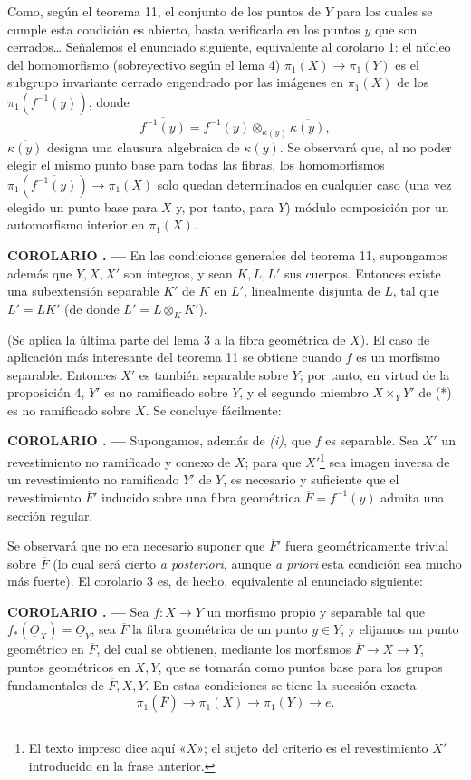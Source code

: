 \documentclass[11pt,twoside,openany]{book}
\numberwithin{equation}{section}
\newcommand{\src}[1]{%
  \phantomsection\hypertarget{src:#1}{}%
  \marginpar{\raggedleft\footnotesize\sffamily #1}%
}
\newcommand{\Osh}{\underline{O}}
\theoremstyle{plain}
\theoremstyle{definition}
\theoremstyle{remark}
\newcommand{\result}[2]{%
  \par\medskip\noindent\textbf{#1%
  \if\relax\detokenize{#2}\relax\else\space#2\fi. ---}\enspace
}
\newcommand{\FgaUnitKey}{frontmatter}
\renewcommand{\src}[1]{%
  \phantomsection\hypertarget{src:\FgaUnitKey:#1}{}%
  \marginpar{\raggedleft\footnotesize\sffamily #1}%
}
\theoremstyle{plain}
\theoremstyle{definition}
\theoremstyle{remark}
\begin{document}
Como, según el teorema 11, el conjunto de los puntos de $Y$ para los cuales se
cumple esta condición es abierto, basta verificarla en los puntos $y$ que son
cerrados\ldots{} Señalemos el enunciado siguiente, equivalente al corolario 1:
el núcleo del homomorfismo (sobreyectivo según el lema 4)
$\pi_1(X)\longrightarrow\pi_1(Y)$ es el subgrupo invariante cerrado engendrado
por las imágenes en $\pi_1(X)$ de los $\pi_1(\overline{f^{-1}(y)})$, donde
\[
  \overline{f^{-1}(y)}
  =f^{-1}(y)\otimes_{\kappa(y)}\overline{\kappa(y)},
\]
$\overline{\kappa(y)}$ designa una clausura algebraica de $\kappa(y)$. Se
observará que, al no poder elegir el mismo punto base para todas las fibras,
los homomorfismos $\pi_1(\overline{f^{-1}(y)})\longrightarrow\pi_1(X)$ solo
quedan determinados en cualquier caso (una vez elegido un punto base para $X$
y, por tanto, para $Y$) módulo composición por un automorfismo interior en
$\pi_1(X)$.

\result{COROLARIO}{2} En las condiciones generales del teorema 11, supongamos
además que $Y,X,X'$ son íntegros, y sean $K,L,L'$ sus cuerpos. Entonces existe
una subextensión separable $K'$ de $K$ en $L'$, linealmente disjunta de $L$, tal
que $L'=LK'$ (de donde $L'=L\otimes_K K'$).

(Se aplica la última parte del lema 3 a la fibra geométrica de $X$). El caso de
aplicación más interesante del teorema 11 se obtiene cuando $f$ es un morfismo
separable. Entonces $X'$ es también separable sobre $Y$; por tanto, en virtud
de la proposición 4, $Y'$ es no ramificado sobre $Y$, y el segundo miembro
$X\times_Y Y'$ de (*) es no ramificado sobre $X$. Se concluye fácilmente:

\result{COROLARIO}{3} Supongamos, además de \textit{(i)}, que $f$ es separable.
Sea $X'$ un revestimiento no ramificado y conexo de $X$; para que
$X'$\footnote{El texto impreso dice aquí «$X$»; el sujeto del criterio es el
revestimiento $X'$ introducido en la frase anterior.} sea imagen inversa de un
revestimiento no ramificado $Y'$ de $Y$, es necesario y suficiente que el
revestimiento $\overline F'$ inducido sobre una fibra geométrica
$\overline F=f^{-1}(y)$ admita una sección regular.

Se observará que no era necesario suponer que $\overline F'$ fuera
geométricamente trivial sobre $\overline F$ (lo cual será cierto \textit{a
posteriori}, aunque \textit{a priori} esta condición sea mucho más fuerte). El
corolario 3 es, de hecho, equivalente al enunciado siguiente:

\src{215}
\result{COROLARIO}{4} Sea $f:X\longrightarrow Y$ un morfismo propio y separable
tal que $f_*(\Osh_X)=\Osh_Y$, sea $\overline F$ la fibra geométrica de un punto
$y\in Y$, y elijamos un punto geométrico en $\overline F$, del cual se obtienen,
mediante los morfismos $\overline F\longrightarrow X\longrightarrow Y$, puntos
geométricos en $X,Y$, que se tomarán como puntos base para los grupos
fundamentales de $\overline F,X,Y$. En estas condiciones se tiene la sucesión
exacta
\[
  \boxed{
    \pi_1(\overline F)\longrightarrow\pi_1(X)
    \longrightarrow\pi_1(Y)\longrightarrow e
  }.
\]
\end{document}
